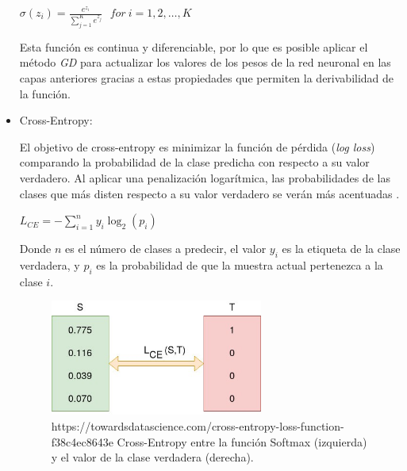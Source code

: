\begin{itemize}
                    \begin{center}
                        $\sigma(z_i) = \frac{e^{z_{i}}}{\sum_{j=1}^K e^{z_{j}}} \ \ \ for\ i=1,2,\dots,K$
                    \end{center}


                    Esta función es continua y diferenciable, por lo que es posible aplicar el método \textit{GD} para actualizar los valores de los pesos de la red neuronal en las capas anteriores gracias a estas propiedades que permiten la derivabilidad de la función.


                \item Cross-Entropy:

                    El objetivo de cross-entropy es minimizar la función de pérdida (\textit{log loss}) comparando la probabilidad de la clase predicha con respecto a su valor verdadero. Al aplicar una penalización logarítmica, las probabilidades de las clases que más disten respecto a su valor verdadero se verán más acentuadas \cite{Cross-Entropy}.

                    \begin{center}
                        $L_{CE} = -\sum_{i = 1}^n y_i \log_2(p_i)$
                    \end{center}

                    Donde $n$ es el número de clases a predecir, el valor $y_i$ es la etiqueta de la clase verdadera, y $p_i$ es la probabilidad de que la muestra actual pertenezca a la clase $i$.

                    \begin{figure}[h]
                        \centering
                        \includegraphics[width=7cm]{archivos/3.Tecnologias/RedesNeuronales/CrossEntropy}
                        \caption{https://towardsdatascience.com/cross-entropy-loss-function-f38c4ec8643e Cross-Entropy entre la función Softmax (izquierda) y el valor de la clase verdadera (derecha).}
                        \label{CrossEntropyImage}
                     \end{figure}


\end{itemize}
